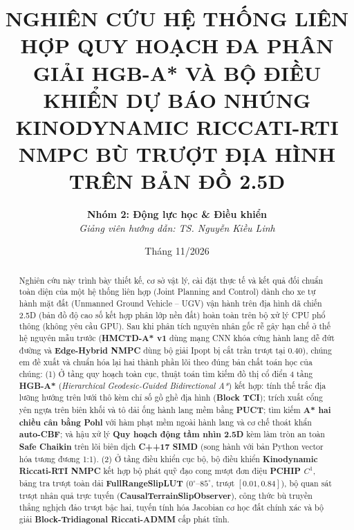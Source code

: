 \documentclass[12pt, a4paper]{article}
\title{\textbf{NGHIÊN CỨU HỆ THỐNG LIÊN HỢP QUY HOẠCH ĐA PHÂN GIẢI HGB-A* VÀ BỘ ĐIỀU KHIỂN DỰ BÁO NHÚNG KINODYNAMIC RICCATI-RTI NMPC BÙ TRƯỢT ĐỊA HÌNH TRÊN BẢN ĐỒ 2.5D}}
\author{
    \textbf{Nhóm 2: Động lực học \& Điều khiển} \\
    \textit{Giảng viên hướng dẫn: TS. Nguyễn Kiều Linh}
}
\date{Tháng 11/2026}
\begin{document}
\maketitle

\begin{abstract}
Nghiên cứu này trình bày thiết kế, cơ sở vật lý, cài đặt thực tế và kết quả đối chuẩn toàn diện của một hệ thống liên hợp (Joint Planning and Control) dành cho xe tự hành mặt đất (Unmanned Ground Vehicle -- UGV) vận hành trên địa hình dã chiến 2.5D (bản đồ độ cao số kết hợp phân lớp nền đất) hoàn toàn trên bộ xử lý CPU phổ thông (không yêu cầu GPU). Sau khi phân tích nguyên nhân gốc rễ gây hạn chế ở thế hệ nguyên mẫu trước (\textbf{HMCTD-A* v1} dùng mạng CNN khóa cứng hành lang dễ đứt đường và \textbf{Edge-Hybrid NMPC} dùng bộ giải Ipopt bị cắt trần trượt tại $0.40$), chúng em đề xuất và chuẩn hóa lại hai thành phần lõi theo đúng bản chất toán học của chúng:
(1) Ở tầng quy hoạch toàn cục, thuật toán tìm kiếm đồ thị cổ điển 4 tầng \textbf{HGB-A*} (\textit{Hierarchical Geodesic-Guided Bidirectional A*}) kết hợp: tính thế trắc địa lưỡng hướng trên lưới thô kèm chỉ số gồ ghề địa hình (\textbf{Block TCI}); trích xuất cổng yên ngựa trên biên khối và tô dải ống hành lang mềm bằng \textbf{PUCT}; tìm kiếm \textbf{A* hai chiều cân bằng Pohl} với hàm phạt mềm ngoài hành lang và cơ chế thoát khẩn \textbf{auto-CBF}; và hậu xử lý \textbf{Quy hoạch động tầm nhìn 2.5D} kèm làm tròn an toàn \textbf{Safe Chaikin} trên lõi biên dịch \textbf{C++17 SIMD} (song hành với bản Python vector hóa tương đương 1:1).
(2) Ở tầng điều khiển cục bộ, bộ điều khiển \textbf{Kinodynamic Riccati-RTI NMPC} kết hợp bộ phát quỹ đạo cong mượt đơn điệu \textbf{PCHIP $C^1$}, bảng tra trượt toàn dải \textbf{FullRangeSlipLUT} ($0^\circ\text{--}85^\circ$, trượt $[0.01, 0.84]$), bộ quan sát trượt nhân quả trực tuyến (\textbf{CausalTerrainSlipObserver}), công thức bù truyền thẳng nghịch đảo trượt bậc hai, tuyến tính hóa Jacobian cơ học đất chính xác và bộ giải \textbf{Block-Tridiagonal Riccati-ADMM} cấp phát tĩnh.


\end{abstract}
\end{document}
